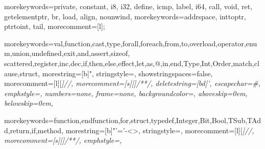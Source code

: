 \let\ea\expandafter

\usepackage[scaled=0.82]{beramono}




\ifdefined\trformat
\usepackage[colorlinks,pdfpagelabels=false]{hyperref}
\else
\usepackage[colorlinks]{hyperref}
\fi
\usepackage[toc,nonumberlist]{glossaries}
\usepackage[nottoc]{tocbibind}
\usepackage[capitalise]{cleveref}
\usepackage{footnote}
\usepackage{threeparttable}
{
	morekeywords={private, constant, i8, i32, define, icmp, label, i64, call, void, ret, getelementptr, br, load, align, nounwind},
	morekeywords={addrspace, inttoptr, ptrtoint, tail},
	morecomment=[l];
}%

  { morekeywords={val,function,cast,type,forall,foreach,from,to,overload,operator,enum,union,undefined,exit,and,assert,sizeof,
      scattered,register,inc,dec,if,then,else,effect,let,as,@,in,end,Type,Int,Order,match,clause,struct},
    morestring=[b]",
    stringstyle={\ttfamily\color{red}},
    showstringspaces=false,
    morecomment=[l][\itshape\color{DarkGreen}]{//},
    morecomment=[s][\itshape\color{DarkGreen}]{/*}{*/},
    deletestring=[bd]{'},
    escapechar=\#,
    emphstyle={\it},
    numbers=none,
    frame=none,
    backgroundcolor=\color{White},
    aboveskip=0em,
    belowskip=0em,
  }

{ morekeywords={function,endfunction,for,struct,typedef,Integer,Bit,Bool,TSub,TAdd,return,if,method},
  morestring=[b]"'=’-<>,
  stringstyle={\ttfamily\color{red}},
  morecomment=[l][\itshape\color{DarkGreen}]{//},
  morecomment=[s][\itshape\color{DarkGreen}]{/*}{*/},
  emphstyle={\it},
}

